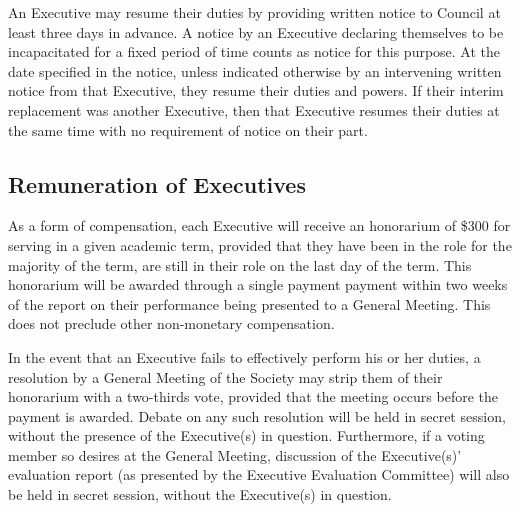 An Executive may resume their duties by providing written notice to Council at
least three days in advance. A notice by an Executive declaring themselves to be
incapacitated for a fixed period of time counts as notice for this purpose. At
the date specified in the notice, unless indicated otherwise by an intervening
written notice from that Executive, they resume their duties and powers. If
their interim replacement was another Executive, then that Executive resumes
their duties at the same time with no requirement of notice on their part.

\subsection{Remuneration of Executives}
As a form of compensation, each Executive will receive an honorarium of \$300 for serving in a given academic term, provided that they have been in the role for the majority of the term, are still in their role on the last day of the term. This honorarium will be awarded through a single payment payment within two weeks of the report on their performance being presented to a General Meeting. This does not preclude other non-monetary compensation. 

In the event that an Executive fails to effectively perform his or her duties, a resolution by a General Meeting of the Society may strip them of their honorarium with a two-thirds vote, provided that the meeting occurs before the payment is awarded. Debate on any such resolution will be held in secret session, without the presence of the Executive(s) in question. Furthermore, if a voting member so desires at the General Meeting, discussion of the Executive(s)' evaluation report (as presented by the Executive Evaluation Committee) will also be held in secret session, without the Executive(s) in question.